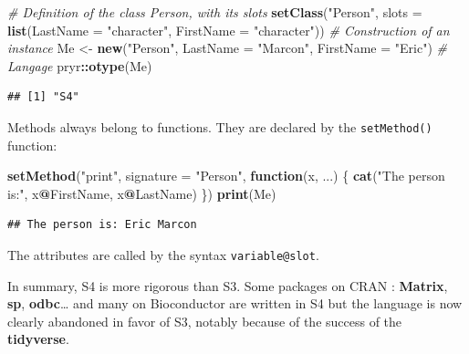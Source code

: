 \documentclass[
  12pt,
  american,
  a4paper,
  extrafontsizes,onecolumn,openright
  ]{memoir}
\newenvironment{Shaded}{\begin{snugshade}}{\end{snugshade}}
\newcommand{\AttributeTok}[1]{\textcolor[rgb]{0.13,0.29,0.53}{#1}}
\newcommand{\CommentTok}[1]{\textcolor[rgb]{0.56,0.35,0.01}{\textit{#1}}}
\newcommand{\ControlFlowTok}[1]{\textcolor[rgb]{0.13,0.29,0.53}{\textbf{#1}}}
\newcommand{\FunctionTok}[1]{\textcolor[rgb]{0.13,0.29,0.53}{\textbf{#1}}}
\newcommand{\NormalTok}[1]{#1}
\newcommand{\OtherTok}[1]{\textcolor[rgb]{0.56,0.35,0.01}{#1}}
\newcommand{\SpecialCharTok}[1]{\textcolor[rgb]{0.81,0.36,0.00}{\textbf{#1}}}
\newcommand{\StringTok}[1]{\textcolor[rgb]{0.31,0.60,0.02}{#1}}
\begin{document}
\scriptsize

\begin{Shaded}
\begin{Highlighting}[]
\CommentTok{\# Definition of the class Person, with its slots}
\FunctionTok{setClass}\NormalTok{(}\StringTok{"Person"}\NormalTok{,  }
         \AttributeTok{slots =} \FunctionTok{list}\NormalTok{(}\AttributeTok{LastName =} \StringTok{"character"}\NormalTok{, }\AttributeTok{FirstName =} \StringTok{"character"}\NormalTok{))}
\CommentTok{\#  Construction of an instance}
\NormalTok{Me }\OtherTok{\textless{}{-}} \FunctionTok{new}\NormalTok{(}\StringTok{"Person"}\NormalTok{, }\AttributeTok{LastName =} \StringTok{"Marcon"}\NormalTok{, }\AttributeTok{FirstName =} \StringTok{"Eric"}\NormalTok{)}
\CommentTok{\# Langage}
\NormalTok{pryr}\SpecialCharTok{::}\FunctionTok{otype}\NormalTok{(Me)}
\end{Highlighting}
\end{Shaded}

\begin{verbatim}
## [1] "S4"
\end{verbatim}

\normalsize

Methods always belong to functions.
They are declared by the \texttt{setMethod()} function:

\scriptsize

\begin{Shaded}
\begin{Highlighting}[]
\FunctionTok{setMethod}\NormalTok{(}\StringTok{"print"}\NormalTok{, }\AttributeTok{signature =} \StringTok{"Person"}\NormalTok{, }\ControlFlowTok{function}\NormalTok{(x, ...) \{}
    \FunctionTok{cat}\NormalTok{(}\StringTok{"The person is:"}\NormalTok{, x}\SpecialCharTok{@}\NormalTok{FirstName, x}\SpecialCharTok{@}\NormalTok{LastName)}
\NormalTok{\})}
\FunctionTok{print}\NormalTok{(Me)}
\end{Highlighting}
\end{Shaded}

\begin{verbatim}
## The person is: Eric Marcon
\end{verbatim}

\normalsize

The attributes are called by the syntax \texttt{variable@slot}.

In summary, S4 is more rigorous than S3.
Some packages on CRAN : \textbf{Matrix}, \textbf{sp}, \textbf{odbc}\ldots{} and many on Bioconductor are written in S4 but the language is now clearly abandoned in favor of S3, notably because of the success of the \textbf{tidyverse}.
\end{document}
